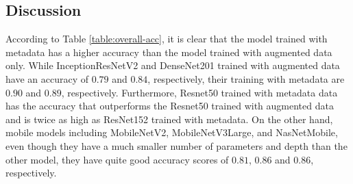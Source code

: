 \documentclass[sensors,article,accept,pdftex,moreauthors]{Definitions/mdpi}
\begin{document}
	\subsection{Discussion} 

	
	According to Table \ref{table:overall-acc}, it is clear that the model trained with metadata has a higher accuracy than the model trained with augmented data only. While InceptionResNetV2 and DenseNet201 trained with augmented data have an accuracy of $0.79$ and $0.84$, respectively, their training with metadata are $0.90$ and $0.89$, respectively. Furthermore, Resnet50 trained with metadata data has the accuracy that outperforms the Resnet50 trained with augmented data and is twice as high as ResNet152 trained with metadata. On the other hand, mobile models including MobileNetV2, MobileNetV3Large, and NasNetMobile, even though they have a much smaller number of parameters and depth than the other model, they have quite good accuracy scores of $0.81$, $0.86$ and $0.86$, respectively. 
	
\end{document}
